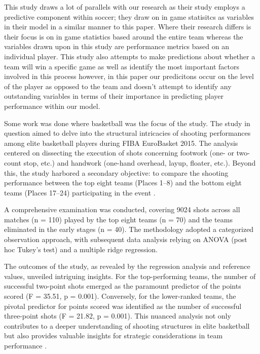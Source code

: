 \documentclass[12pt]{article}
\begin{document}
This study draws a lot of parallels with our research as their study employs
a predictive component within soccer; they draw on in game statisitcs as variables
in their model in a similar manner to this paper. Where their research differs
is their focus is on in game statistics based around the entire team
whereas the variables drawn upon in this study are performance metrics based on 
an individual player. This study also attempts to make predictions about whether
a team will win a specific game as well as identify the most important factors
involved in this process however, in this paper our predicitons occur on the
level of the player as opposed to the team and doesn't attempt to identify
any outstanding variables in terms of their importance in predicting player 
performance within our model.


Some work was done where basketball was the focus of the study. 
The study in question aimed to delve into the structural intricacies of shooting
performances among elite basketball players during FIBA EuroBasket 2015.
The analysis centered on dissecting the execution of shots concerning footwork
(one- or two-count stop, etc.) and handwork (one-hand overhead, layup, floater, etc.). 
Beyond this, the study harbored a secondary objective: to compare the shooting
performance between the top eight teams (Places 1–8) and the bottom eight teams
(Places 17–24) participating in the event \citep{gryko2018structural}.

A comprehensive examination was conducted, covering 9024 shots across all matches
(n = 110) played by the top eight teams (n = 70) and the teams eliminated in the
early stages (n = 40). The methodology adopted a categorized observation approach,
with subsequent data analysis relying on ANOVA (post hoc Tukey’s test) and a
multiple ridge regression.

The outcomes of the study, as revealed by the regression analysis and reference
values, unveiled intriguing insights. For the top-performing teams, the number of
successful two-point shots emerged as the paramount predictor of the points scored
(F = 35.51, p = 0.001). Conversely, for the lower-ranked teams, the pivotal
predictor for points scored was identified as the number of successful
three-point shots (F = 21.82, p = 0.001). This nuanced analysis not only
contributes to a deeper understanding of shooting structures in elite basketball
but also provides valuable insights for strategic considerations in team
performance \citep{gryko2018structural}.
\end{document}
